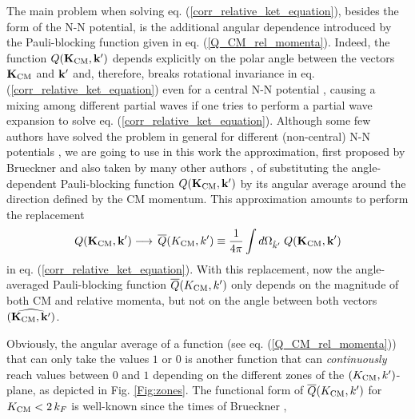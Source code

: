 \documentclass[aps,twocolumn,showpacs,preprintnumbers,amsmath,amssymb,nofootinbib,superscriptaddress,showkeys,noeprint]{revtex4-1}
\newcommand{\nk}{{\bf k}}
\newcommand{\nK}{{\bf K}}
\begin{document}
The main problem when solving eq. (\ref{corr_relative_ket_equation}),
besides the form of the N-N potential, is the additional angular
dependence introduced by the Pauli-blocking function given in
eq. (\ref{Q_CM_rel_momenta}). Indeed, the function $Q(\nK_{\rm
  CM},\nk^\prime)$ depends explicitly on the polar angle between the
vectors $\nK_{\rm CM}$ and $\nk^\prime$ and, therefore, breaks
rotational invariance in eq.  (\ref{corr_relative_ket_equation}) even
for a central N-N potential \cite{werner1959solution}, causing a
mixing among different partial waves if one tries to perform a partial
wave expansion to solve eq.
(\ref{corr_relative_ket_equation}). Although some few authors have
solved the problem in general for different (non-central) N-N
potentials \cite{Cheon:1988hn, Schiller:1998ff, Suzuki:1999jb,
  Sammarruca:2000dd, Stephenson:2004xs, White:2014oca}, we are going
to use in this work the approximation, first proposed by Brueckner
\cite{Brueckner:1958zz} and also taken by many other authors
\cite{Bhargava:1967a, Kallio:1969mis, Haftel:1970zz, Jeukenne:1974zz,
  Muther:1995bk, Alonso:2003aq}, of substituting the angle-dependent
Pauli-blocking function $Q(\nK_{\rm CM},\nk^\prime)$ by its angular
average around the direction defined by the CM momentum.  This
approximation amounts to perform the replacement
\begin{equation}\label{def_angular_average}
Q(\nK_{\rm CM},\nk^\prime)\longrightarrow\,
\overline{Q}(K_{\rm CM},k^\prime)\equiv
\frac{1}{4\pi}\int d\Omega_{\hat{k}^\prime}\;
Q(\nK_{\rm CM},\nk^\prime)
\end{equation}
in eq. (\ref{corr_relative_ket_equation}). With this replacement, now
the angle-averaged Pauli-blocking function $\overline{Q}(K_{\rm
  CM},k^\prime)$ only depends on the magnitude of both CM and relative
momenta, but not on the angle between both vectors $(\widehat{\nK_{\rm
    CM},\nk^\prime})$.
 
Obviously, the angular average of a function (see
eq. (\ref{Q_CM_rel_momenta})) that can only take the values $1$ or $0$
is another function that can \emph{continuously} reach values between
$0$ and $1$ depending on the different zones of the $(K_{\rm
  CM},k^\prime)$-plane, as depicted in Fig.  \ref{Fig:zones}. The
functional form of $\overline{Q}(K_{\rm CM},k^\prime)$ for $K_{\rm
  CM}<2\, k_F$ is well-known since the times of Brueckner
\cite{Brueckner:1958zz},
\end{document}
